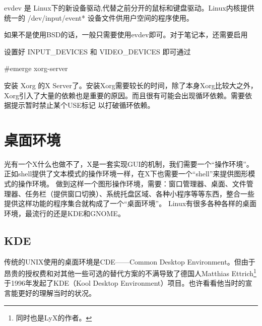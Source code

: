 evdev 是 Linux下的新设备驱动,代替之前分开的鼠标和键盘驱动。Linux内核提供统一的 /dev/input/event* 设备文件供用户空间的程序使用。

如果不是使用BSD的话，一般只需要使用evdev即可。对于笔记本，还需要启用 

设置好  INPUT\_DEVICES 和 VIDEO\_DEVICES 即可通过

\begin{code}
\#emerge xorg-server
\end{code}

安装 Xorg 的X Server了。安装Xorg需要较长的时间，除了本身Xorg比较大之外，Xorg引入了大量的依赖也是重要的原因。而且很有可能会出现循环依赖。需要依据提示暂时禁止某个USE标记
以打破循环依赖。

\section{桌面环境}

光有一个X什么也做不了，X是一套实现GUI的机制，我们需要一个“操作环境”。正如shell提供了文本模式的操作环境一样，在X下也需要一个“shell”来提供图形模式的操作环境。
做到这样一个图形操作环境，需要：窗口管理器、桌面、文件管理器、任务栏（提供窗口切换）、系统托盘区域、各种小程序等等东西，整合一些提供这样功能的程序集合就构成了一个“桌面环境”。
Linux有很多各种各样的桌面环境，最流行的还是KDE和GNOME。

\subsection{KDE}

传统的UNIX使用的桌面环境是CDE——Common Desktop Environment。但由于昂贵的授权费和对其他一些可选的替代方案的不满导致了德国人Matthias Ettrich\footnote{同时也是LyX的作者。}于1996年发起了KDE（Kool Desktop Environment）项目。也许看看他当时的宣言能更好的理解当时的状况。


